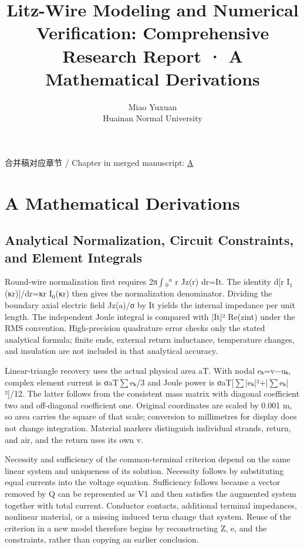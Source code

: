 \documentclass[11pt]{article}
\begin{document}
\title{Litz-Wire Modeling and Numerical Verification: Comprehensive Research Report · A Mathematical Derivations}
\author{Miao Yuxuan\\Huainan Normal University}
\date{}
\maketitle
\noindent 合并稿对应章节 / Chapter in merged manuscript: \href{report_en_single.pdf#chapter-A}{A}\par
\FloatBarrier
\section*{A Mathematical Derivations}
\hypertarget{chapter-A}{}
\subsection*{Analytical Normalization, Circuit Constraints, and Element Integrals}
\hypertarget{A.report_derivation.heading}{}
Round-wire normalization first requires 2π\(\int\)\(_0\)\(^a\) r Jz(r) dr=It. The identity d[r I\(_1\)(κr)]/dr=κr I\(_0\)(κr) then gives the normalization denominator. Dividing the boundary axial electric field Jz(a)/σ by It yields the internal impedance per unit length. The independent Joule integral is compared with |It|² Re(zint) under the RMS convention. High-precision quadrature error checks only the stated analytical formula; finite ends, external return inductance, temperature changes, and insulation are not included in that analytical accuracy.


Linear-triangle recovery uses the actual physical area aT. With nodal eₖ=v−uₖ, complex element current is σaT\(\sum\)eₖ/3 and Joule power is σaT[\(\sum\)|eₖ|²+|\(\sum\)eₖ|²]/12. The latter follows from the consistent mass matrix with diagonal coefficient two and off-diagonal coefficient one. Original coordinates are scaled by 0.001 m, so area carries the square of that scale; conversion to millimetres for display does not change integration. Material markers distinguish individual strands, return, and air, and the return uses its own v.


Necessity and sufficiency of the common-terminal criterion depend on the same linear system and uniqueness of its solution. Necessity follows by substituting equal currents into the voltage equation. Sufficiency follows because a vector removed by Q can be represented as V1 and then satisfies the augmented system together with total current. Conductor contacts, additional terminal impedances, nonlinear material, or a missing induced term change that system. Reuse of the criterion in a new model therefore begins by reconstructing Z, e, and the constraints, rather than copying an earlier conclusion.
\end{document}

